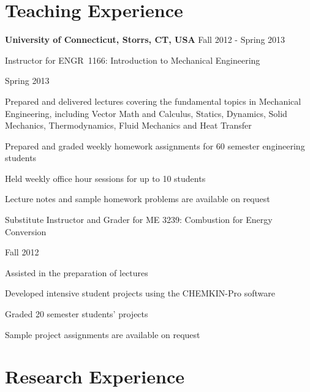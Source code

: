 \section{Teaching Experience}
{\bf University of Connecticut, Storrs, CT, USA} \hfill Fall 2012 - Spring 2013
\begin{outerlist}
    \item[] Instructor for ENGR~1166: Introduction to Mechanical Engineering
        \begin{innerlist}
            \item Spring 2013
            \item Prepared and delivered lectures covering the fundamental topics in Mechanical Engineering, including Vector Math and Calculus, Statics, Dynamics, Solid Mechanics, Thermodynamics, Fluid Mechanics and Heat Transfer
            \item Prepared and graded weekly homework assignments for 60  semester engineering students
            \item Held weekly office hour sessions for up to 10 students
            \item[] Lecture notes and sample homework problems are available on request
        \end{innerlist}

        \halfblankline

   \item[] Substitute Instructor and Grader for ME 3239: Combustion for Energy Conversion
        \begin{innerlist}
            \item Fall 2012
            \item Assisted in the preparation of lectures
            \item Developed intensive student projects using the CHEMKIN-Pro software
            \item Graded 20  semester students' projects
            \item[] Sample project assignments are available on request
        \end{innerlist}

\end{outerlist}


\section{Research Experience}

